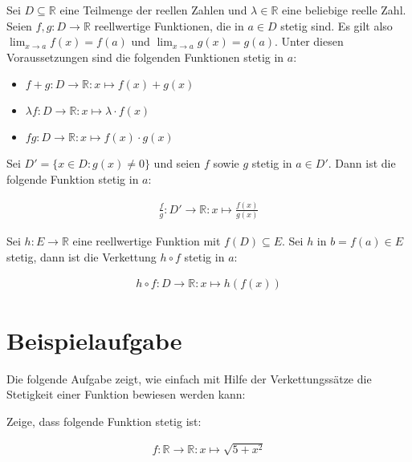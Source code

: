 \documentclass[fontsize=9pt,
               parskip=half-,
               DIV=14,
               listof=chapterentry,
               tocflat]{scrbook}
\begin{document}
\begin{theorem*}[Verkettungssätze]
Sei $D\subseteq \mathbb {R} $ eine Teilmenge der reellen Zahlen und $\lambda \in \mathbb {R} $ eine beliebige reelle Zahl. Seien $f,g:D\to \mathbb {R} $ reellwertige Funktionen, die in $a\in D$ stetig sind. Es gilt also $\lim _{x\to a}{f(x)}=f(a)$ und $\lim _{x\to a}{g(x)}=g(a)$. Unter diesen Voraussetzungen sind die folgenden Funktionen stetig in $a$:

\begin{itemize}
\item $f+g:D\to \mathbb {R} :x\mapsto f(x)+g(x)$
\item $\lambda f:D\to \mathbb {R} :x\mapsto \lambda \cdot f(x)$
\item $fg:D\to \mathbb {R} :x\mapsto f(x)\cdot g(x)$
\end{itemize}

Sei $D'=\{x\in D:g(x)\neq 0\}$ und seien $f$ sowie $g$ stetig in $a\in D'$. Dann ist die folgende Funktion stetig in $a$:

\begin{align*}
{\frac {f}{g}}:D'\to \mathbb {R} :x\mapsto {\frac {f(x)}{g(x)}}
\end{align*}

Sei $h:E\to \mathbb {R} $ eine reellwertige Funktion mit $f(D)\subseteq E$. Sei $h$ in $b=f(a)\in E$ stetig, dann ist die Verkettung $h\circ f$ stetig in $a$:

\begin{align*}
h\circ f:D\to \mathbb {R} :x\mapsto h(f(x))
\end{align*}

\end{theorem*}

\section{Beispielaufgabe}

Die folgende Aufgabe zeigt, wie einfach mit Hilfe der Verkettungssätze die Stetigkeit einer Funktion bewiesen werden kann:



\begin{exercise*}
Zeige, dass folgende Funktion stetig ist:

\begin{align*}
f:\mathbb {R} \to \mathbb {R} :x\mapsto {\sqrt {5+x^{2}}}
\end{align*}

\end{exercise*}
\end{document}
